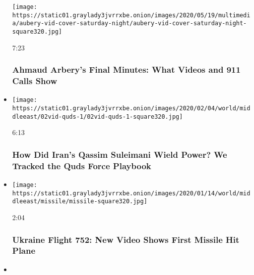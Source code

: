 \begin{itemize}
  \texttt{[image: https://static01.graylady3jvrrxbe.onion/images/2020/05/19/multimedia/aubery-vid-cover-saturday-night/aubery-vid-cover-saturday-night-square320.jpg]}

  7:23

  \hypertarget{ahmaud-arberys-final-minutes-what-videos-and-911-calls-show}{%
  \subsubsection{Ahmaud Arbery's Final Minutes: What Videos and 911
  Calls
  Show}\label{ahmaud-arberys-final-minutes-what-videos-and-911-calls-show}}
\item
  \href{https://www.nytimes3xbfgragh.onion/video/world/middleeast/100000006906161/suleimani-quds-iran.html?action=click\&module=video-series-bar\&region=header\&pgtype=Article\&playlistId=video/investigations}{}

  \texttt{[image: https://static01.graylady3jvrrxbe.onion/images/2020/02/04/world/middleeast/02vid-quds-1/02vid-quds-1-square320.jpg]}

  6:13

  \hypertarget{how-did-irans-qassim-suleimani-wield-power-we-tracked-the-quds-force-playbook}{%
  \subsubsection{How Did Iran's Qassim Suleimani Wield Power? We Tracked
  the Quds Force
  Playbook}\label{how-did-irans-qassim-suleimani-wield-power-we-tracked-the-quds-force-playbook}}
\item
  \href{https://www.nytimes3xbfgragh.onion/video/world/middleeast/100000006920114/iran-plane-missile-video.html?action=click\&module=video-series-bar\&region=header\&pgtype=Article\&playlistId=video/investigations}{}

  \texttt{[image: https://static01.graylady3jvrrxbe.onion/images/2020/01/14/world/middleeast/missile/missile-square320.jpg]}

  2:04

  \hypertarget{ukraine-flight-752-new-video-shows-first-missile-hit-plane}{%
  \subsubsection{Ukraine Flight 752: New Video Shows First Missile Hit
  Plane}\label{ukraine-flight-752-new-video-shows-first-missile-hit-plane}}
\item
  \href{https://www.nytimes3xbfgragh.onion/video/world/middleeast/100000006911696/iran-crash.html?action=click\&module=video-series-bar\&region=header\&pgtype=Article\&playlistId=video/investigations}{}


\end{itemize}
